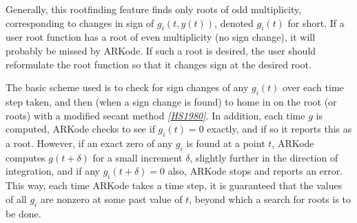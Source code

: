 \documentclass[letterpaper,10pt,english]{sphinxmanual}
\begin{document}
Generally, this rootfinding feature finds only roots of odd
multiplicity, corresponding to changes in sign of \(g_i(t,
y(t))\), denoted \(g_i(t)\) for short. If a user root function has
a root of even multiplicity (no sign change), it will probably be
missed by ARKode. If such a root is desired, the user should
reformulate the root function so that it changes sign at the desired
root.

The basic scheme used is to check for sign changes of any
\(g_i(t)\) over each time step taken, and then (when a sign change
is found) to home in on the root (or roots) with a modified secant
method \label{Mathematics:id18}{\hyperref[References:hs1980]{\emph{{[}HS1980{]}}}}.  In addition, each time \(g\) is
computed, ARKode checks to see if \(g_i(t) = 0\) exactly, and if
so it reports this as a root. However, if an exact zero of any
\(g_i\) is found at a point \(t\), ARKode computes
\(g(t+\delta)\) for a small increment \(\delta\), slightly
further in the direction of integration, and if any
\(g_i(t+\delta) = 0\) also, ARKode stops and reports an
error. This way, each time ARKode takes a time step, it is guaranteed
that the values of all \(g_i\) are nonzero at some past value of
\(t\), beyond which a search for roots is to be done.
\end{document}
